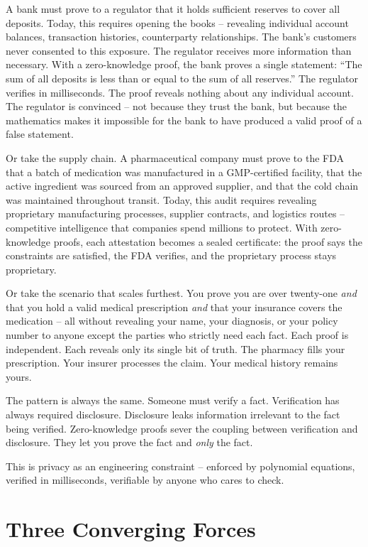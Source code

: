 \documentclass[
  11pt,
  openany]{report}
\begin{document}
A bank must prove to a regulator that it holds sufficient reserves to cover all
deposits. Today, this requires opening the books -- revealing individual account
balances, transaction histories, counterparty relationships. The bank's
customers never consented to this exposure. The regulator receives more
information than necessary. With a zero-knowledge proof, the bank proves a
single statement: ``The sum of all deposits is less than or equal to the sum of
all reserves.'' The regulator verifies in milliseconds. The proof reveals
nothing about any individual account. The regulator is convinced -- not because
they trust the bank, but because the mathematics makes it impossible for the
bank to have produced a valid proof of a false statement.

Or take the supply chain. A pharmaceutical company must prove to the FDA that a
batch of medication was manufactured in a GMP-certified facility, that the
active ingredient was sourced from an approved supplier, and that the cold chain
was maintained throughout transit. Today, this audit requires revealing
proprietary manufacturing processes, supplier contracts, and logistics routes --
competitive intelligence that companies spend millions to protect. With
zero-knowledge proofs, each attestation becomes a sealed certificate: the proof
says the constraints are satisfied, the FDA verifies, and the proprietary
process stays proprietary.

Or take the scenario that scales furthest. You prove you are over twenty-one
\emph{and} that you hold a valid medical prescription \emph{and} that your
insurance covers the medication -- all without revealing your name, your
diagnosis, or your policy number to anyone except the parties who strictly need
each fact. Each proof is independent. Each reveals only its single bit of truth.
The pharmacy fills your prescription. Your insurer processes the claim. Your
medical history remains yours.

The pattern is always the same. Someone must verify a fact. Verification has
always required disclosure. Disclosure leaks information irrelevant to the fact
being verified. Zero-knowledge proofs sever the coupling between verification
and disclosure. They let you prove the fact and \emph{only} the fact.

This is privacy as an engineering constraint -- enforced by polynomial
equations, verified in milliseconds, verifiable by anyone who cares to check.

\section{Three Converging Forces}\label{three-converging-forces}
\end{document}
